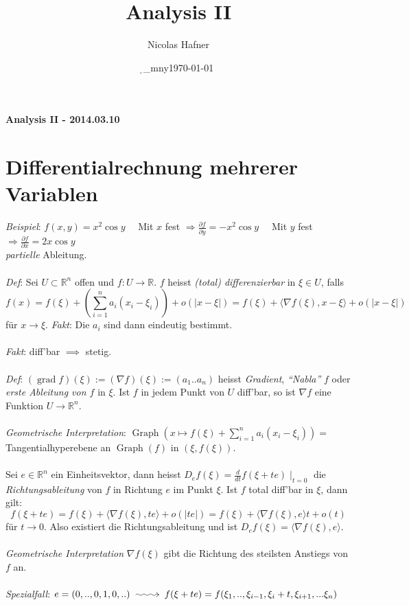 \documentclass[12pt,a4paper,titlepage]{article}
\author{Nicolas Hafner}
\title{Analysis II}
\date{\d_mny\today}
\makeatletter
\newcommand{\longsquiggly}{\xymatrix{{}\ar@{~>}[r]&{}}}
\renewcommand{\d}{\partial}
\newcommand{\setR}{\mathbb{R}}
\newcommand{\Graph}{\operatorname{Graph}}
\makeatother
\begin{document}
	
\begin{center}{\bfseries\Huge Analysis II - 2014.03.10}\end{center}
\section*{Differentialrechnung mehrerer Variablen}
\textit{Beispiel}: $f(x,y)=x^2\cos y \quad$ Mit $x$ fest $\Rightarrow \frac{\d f}{\d y}=-x^2\cos y\quad$ Mit $y$ fest $\Rightarrow \frac{\d f}{\d x}=2x\cos y$ \\
\emph{partielle} Ableitung. \\
\\
\textit{Def}: Sei $U\subset\setR^n$ offen und $f:U\to\setR$. $f$ heisst \emph{(total) differenzierbar} in $\xi\in U$, falls
$$f(x)=f(\xi)+(\sum_{i=1}^n a_i(x_i-\xi_i))+o(|x-\xi|)=f(\xi)+\langle\nabla f(\xi),x-\xi\rangle+o(|x-\xi|)$$
für $x\to\xi$. \textit{Fakt}: Die $a_i$ sind dann eindeutig bestimmt. \\
\\
\textit{Fakt}: diff'bar $\implies$ stetig. \\
\\
\textit{Def}: $(\operatorname{grad} f)(\xi):=(\nabla f)(\xi):=(a_1..a_n)$ heisst \emph{Gradient}, \emph{``Nabla''} $f$ oder \emph{erste Ableitung von $f$} in $\xi$. Ist $f$ in jedem Punkt von $U$ diff'bar, so ist $\nabla f$ eine Funktion $U\to\setR^n$. \\
\\
\textit{Geometrische Interpretation}: $\operatorname{Graph}(x\mapsto f(\xi)+\sum_{i=1}^n a_i(x_i-\xi_i)) = $ Tangentialhyperebene an $\Graph(f)$ in $(\xi,f(\xi))$. \\
\\
Sei $e\in\setR^n$ ein Einheitsvektor, dann heisst $D_ef(\xi)=\frac{d}{dt}f(\xi+te)\mid_{t=0}$ die \emph{Richtungsableitung} von $f$ in Richtung $e$ im Punkt $\xi$. Ist $f$ total diff'bar in $\xi$, dann gilt:
$$f(\xi+te)=f(\xi)+\langle\nabla f(\xi), te\rangle+o(|te|) = f(\xi)+\langle\nabla f(\xi),e\rangle t+o(t)$$
für $t\to 0$. Also existiert die Richtungsableitung und ist $D_ef(\xi)=\langle\nabla f(\xi), e\rangle$. \\
\\
\textit{Geometrische Interpretation} $\nabla f(\xi)$ gibt die Richtung des steilsten Anstiegs von $f$ an. \\
\\
\textit{Spezialfall}: $e=(0,..,0,1,0,..) \longsquiggly f(\xi+te)=f(\xi_1,..,\xi_{i-1},\xi_i+t,\xi_{i+1},...\xi_n)$ \\
\end{document}
